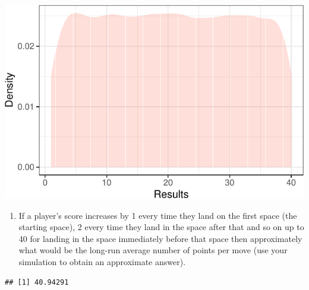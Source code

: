 \documentclass[]{article}
\newenvironment{Shaded}{\begin{snugshade}}{\end{snugshade}}
\newcommand{\CommentTok}[1]{\textcolor[rgb]{0.56,0.35,0.01}{\textit{#1}}}
\newcommand{\DecValTok}[1]{\textcolor[rgb]{0.00,0.00,0.81}{#1}}
\newcommand{\KeywordTok}[1]{\textcolor[rgb]{0.13,0.29,0.53}{\textbf{#1}}}
\newcommand{\NormalTok}[1]{#1}
\newcommand{\OperatorTok}[1]{\textcolor[rgb]{0.81,0.36,0.00}{\textbf{#1}}}
\providecommand{\tightlist}{%
  \setlength{\itemsep}{0pt}\setlength{\parskip}{0pt}}
\begin{document}
\begin{center}\includegraphics{exercises_files/figure-latex/unnamed-chunk-7-1} \end{center}

\begin{enumerate}
\def\labelenumi{\arabic{enumi}.}
\setcounter{enumi}{2}
\tightlist
\item
  If a player's score increases by 1 every time they land on the first
  space (the starting space), 2 every time they land in the space after
  that and so on up to 40 for landing in the space immediately before
  that space then approximately what would be the long-run average
  number of points per move (use your simulation to obtain an
  approximate answer).
\end{enumerate}

\begin{Shaded}
\end{Shaded}

\begin{verbatim}
## [1] 40.94291
\end{verbatim}
\end{document}
